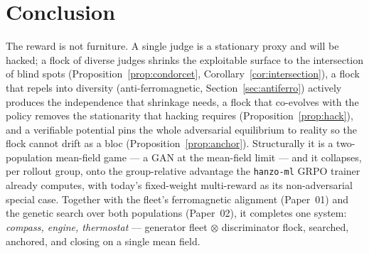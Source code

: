 \documentclass[11pt]{article}
\theoremstyle{definition}
\theoremstyle{remark}
\begin{document}
\section{Conclusion}
\label{sec:conclusion}

The reward is not furniture. A single judge is a stationary proxy and will be hacked; a flock of diverse
judges shrinks the exploitable surface to the intersection of blind spots
(Proposition~\ref{prop:condorcet}, Corollary~\ref{cor:intersection}), a flock that repels into diversity
(anti-ferromagnetic, Section~\ref{sec:antiferro}) actively produces the independence that shrinkage needs,
a flock that co-evolves with the policy removes the stationarity that hacking requires
(Proposition~\ref{prop:hack}), and a verifiable potential pins the whole adversarial equilibrium to reality
so the flock cannot drift as a bloc (Proposition~\ref{prop:anchor}). Structurally it is a two-population
mean-field game --- a GAN at the mean-field limit --- and it collapses, per rollout group, onto the
group-relative advantage the \texttt{hanzo-ml} GRPO trainer already computes, with today's fixed-weight
multi-reward as its non-adversarial special case. Together with the fleet's ferromagnetic alignment
(Paper~01) and the genetic search over both populations (Paper~02), it completes one system:
\emph{compass, engine, thermostat} --- generator fleet $\otimes$ discriminator flock, searched, anchored,
and closing on a single mean field.
\end{document}
